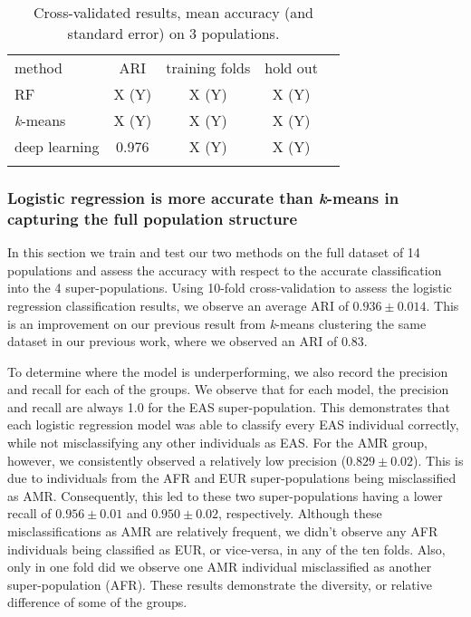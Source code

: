 \documentclass{llncs}
\newcommand{\kMeans}{\textit{k}-means}
\begin{document}
{

\begin{table}
\caption{Cross-validated results, mean accuracy (and standard error) on 3 populations.}
\begin{center}
\renewcommand{\arraystretch}{1.4}
\setlength\tabcolsep{3pt}
\begin{tabular}{lcccc}
\hline\noalign{\smallskip}
method  & ARI & training folds & hold out \\
RF  & X (Y) & X (Y) & X (Y) \\
\kMeans & X (Y) & X (Y) & X (Y) \\
deep learning & 0.976 & X (Y) & X (Y) \\
\noalign{\smallskip}
\hline
\end{tabular}
\end{center}
\end{table}

\subsubsection{Logistic regression is more accurate than \kMeans{} in capturing the full population structure}
In this section we train and test our two methods on the full dataset of 14 populations and assess the accuracy with respect to the accurate
classification into the 4 super-populations.
Using 10-fold cross-validation to assess the logistic regression classification results, we observe an average ARI of \(0.936 \pm{} 0.014\).
This is an improvement on our previous result from \kMeans{} clustering the same dataset in our previous work, where we observed an ARI of \(0.83\).

To determine where the model is underperforming, we also record the precision and recall for each of the groups.
We observe that for each model, the precision and recall are always 1.0 for the EAS super-population.
This demonstrates that each logistic regression model was able to classify every EAS individual correctly, while not misclassifying any other individuals as EAS.
For the AMR group, however, we consistently observed a relatively low precision (\(0.829 \pm{} 0.02 \)).
This is due to individuals from the AFR and EUR super-populations being misclassified as AMR.
Consequently, this led to these two super-populations having a lower recall of \(0.956 \pm 0.01 \) and \(0.950 \pm 0.02 \), respectively.
Although these misclassifications as AMR are relatively frequent, we didn't observe any AFR individuals being classified as EUR, or vice-versa, in any of the ten folds.
Also, only in one fold did we observe one AMR individual misclassified as another super-population (AFR).
These results demonstrate the diversity, or relative difference of some of the groups. 

}
\end{document}
